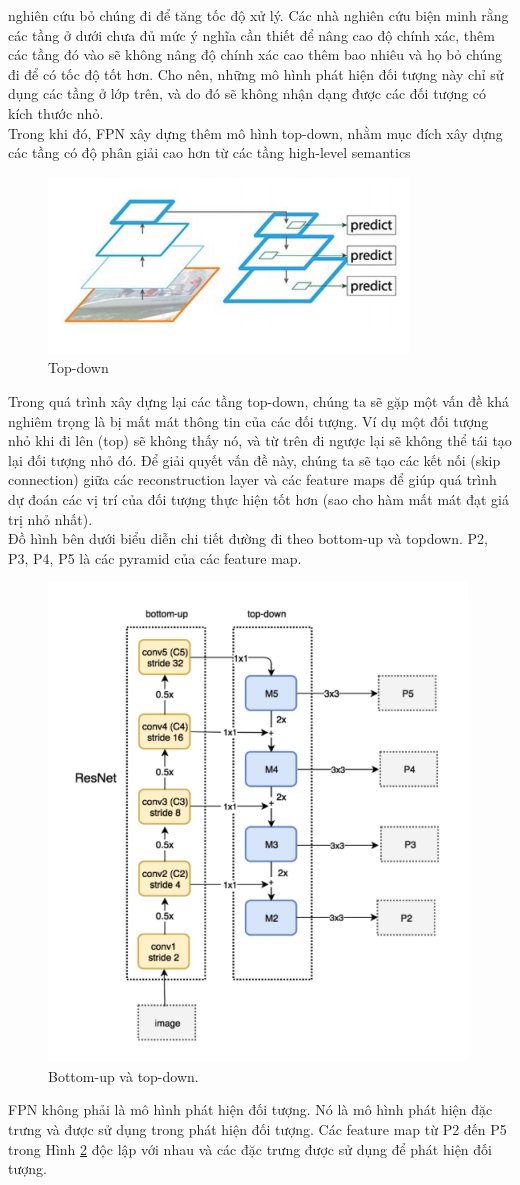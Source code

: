 \documentclass[a4paper, 12pt]{report}
\begin{document}
nghiên cứu bỏ chúng đi để tăng tốc độ xử lý. Các nhà nghiên cứu biện
minh rằng các tầng ở dưới chưa đủ mức ý nghĩa cần thiết để nâng cao độ
chính xác, thêm các tầng đó vào sẽ không nâng độ chính xác cao thêm bao
nhiêu và họ bỏ chúng đi để có tốc độ tốt hơn. Cho nên, những mô hình phát hiện đối tượng này chỉ sử dụng các tầng ở lớp trên, và do đó sẽ không nhận
dạng được các đối tượng có kích thước nhỏ. \\
\hspace*{1cm}Trong khi đó, FPN xây dựng thêm mô hình top-down, nhằm mục đích
xây dựng các tầng có độ phân giải cao hơn từ các tầng high-level semantics \\
\begin{figure}[!h]
	\centering
	\includegraphics[width=0.5\linewidth]{Images/fpn3}
	\caption{Top-down}
	\label{fig:resnet-fpn3}
\end{figure}
\hspace*{1cm}Trong quá trình xây dựng lại các tầng top-down, chúng ta sẽ gặp một
vấn đề khá nghiêm trọng là bị mất mát thông tin của các đối tượng. Ví dụ
một đối tượng nhỏ khi đi lên (top) sẽ không thấy nó, và từ trên đi ngược
lại sẽ không thể tái tạo lại đối tượng nhỏ đó. Để giải quyết vấn đề này,
chúng ta sẽ tạo các kết nối (skip connection) giữa các reconstruction layer
và các feature maps để giúp quá trình dự đoán các vị trí của đối tượng
thực hiện tốt hơn (sao cho hàm mất mát đạt giá trị nhỏ nhất).  \\
\hspace*{1cm}Đồ hình bên dưới biểu diễn chi tiết đường đi theo bottom-up và topdown. P2, P3, P4, P5 là các pyramid của các feature map. \\
\begin{figure}[!h]
	\centering
	\includegraphics[width=0.5\linewidth]{Images/fpn4}
	\caption{Bottom-up và top-down.}
	\label{fig:resnet-fpn4}
\end{figure}
\hspace*{1cm}FPN không phải là mô hình phát hiện đối tượng. Nó là mô hình phát
hiện đặc trưng và được sử dụng trong phát hiện đối tượng. Các feature
map từ P2 đến P5 trong Hình \ref{fig:resnet-fpn4} độc lập với nhau và các đặc trưng
được sử dụng để phát hiện đối tượng.
\end{document}
